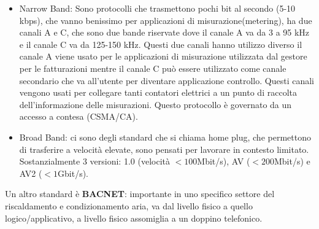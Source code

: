 \documentclass[11pt, twocolumn]{article}
\begin{document}
\begin{itemize}[wide,noitemsep,topsep=0ex]
  \item Narrow Band: Sono protocolli che trasmettono pochi bit al secondo (5-10 kbps), che vanno benissimo per applicazioni di misurazione(metering), ha due canali A e C, che sono due bande riservate dove il canale A va da 3 a 95 kHz e il canale C va da 125-150 kHz.
  Questi due canali hanno utilizzo diverso il canale A viene usato per le applicazioni di misurazione utilizzata dal gestore per le fatturazioni mentre il canale C può essere utilizzato come canale secondario che va all'utente per diventare applicazione controllo.
  Questi canali vengono usati per collegare tanti contatori elettrici a un punto di raccolta dell'informazione delle misurazioni.
  Questo protocollo è governato da un accesso a contesa (CSMA/CA). 
  \item Broad Band: ci sono degli standard che si chiama home plug, che permettono di trasferire a velocità elevate, sono pensati per lavorare in contesto limitato.
  Sostanzialmente 3 versioni: 1.0 (velocità $<100$Mbit/s), AV ($<200$Mbit/s) e AV2 ($<1$Gbit/s). 
\end{itemize}
Un altro standard è \textbf{BACNET}: importante in uno specifico settore del riscaldamento e condizionamento aria, va dal livello fisico a quello logico/applicativo, a livello fisico assomiglia a un doppino telefonico.
\end{document}
